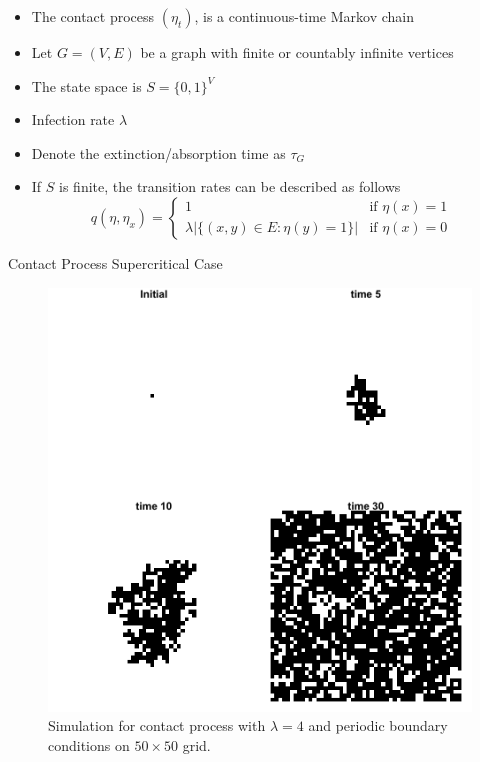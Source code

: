 \documentclass{beamer}
\theoremstyle{definition}
\begin{document}
\begin{frame}
\begin{itemize}
    \item The contact process $(\eta_t)$, is a continuous-time Markov chain
    \item Let $G = (V,E)$ be a graph with finite or countably infinite vertices
    \item The state space is $S = \{0,1\}^V$
    \item Infection rate $\lambda$
    \item Denote the extinction/absorption time as $\tau_{G}$
    \item If $S$ is finite, the transition rates can be described as follows
$$
q(\eta, \eta_x) = \begin{cases}
    1 & \text{if } \eta(x) = 1\\
    \lambda |\{ (x,y) \in E : \eta(y) = 1\}| & \text{if } \eta(x) = 0
\end{cases}
$$
\end{itemize}

\end{frame}

\begin{frame}{Contact Process Supercritical Case}
    \begin{figure}[H]
  \centering
    \includegraphics[width=.65\textwidth]{figures/contact_simulation_torus_25.png}
   \caption{Simulation for contact process with $\lambda = 4$ and periodic boundary conditions on $50 \times 50$ grid.}
  \label{fig:contact_sim_torus_above_crit.png}
\end{figure}
\end{frame}
\end{document}
